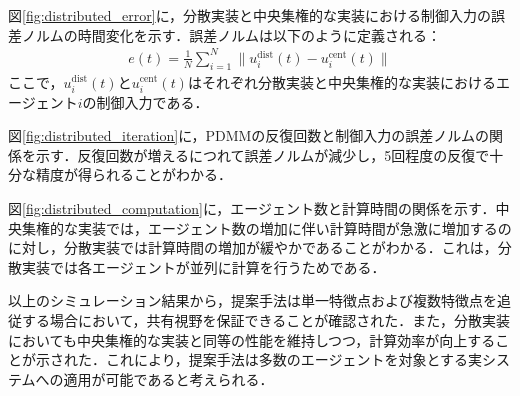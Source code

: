 
図\ref{fig:distributed_error}に，分散実装と中央集権的な実装における制御入力の誤差ノルムの時間変化を示す．誤差ノルムは以下のように定義される：
\begin{equation}
\begin{aligned}
e(t) = \frac{1}{N}\sum_{i=1}^N \|u_i^{\text{dist}}(t) - u_i^{\text{cent}}(t)\|
\label{eq:error_norm}
\end{aligned}
\end{equation}
ここで，$u_i^{\text{dist}}(t)$と$u_i^{\text{cent}}(t)$はそれぞれ分散実装と中央集権的な実装におけるエージェント$i$の制御入力である．


図\ref{fig:distributed_iteration}に，PDMMの反復回数と制御入力の誤差ノルムの関係を示す．反復回数が増えるにつれて誤差ノルムが減少し，5回程度の反復で十分な精度が得られることがわかる．


図\ref{fig:distributed_computation}に，エージェント数と計算時間の関係を示す．中央集権的な実装では，エージェント数の増加に伴い計算時間が急激に増加するのに対し，分散実装では計算時間の増加が緩やかであることがわかる．これは，分散実装では各エージェントが並列に計算を行うためである．


以上のシミュレーション結果から，提案手法は単一特徴点および複数特徴点を追従する場合において，共有視野を保証できることが確認された．また，分散実装においても中央集権的な実装と同等の性能を維持しつつ，計算効率が向上することが示された．これにより，提案手法は多数のエージェントを対象とする実システムへの適用が可能であると考えられる．
